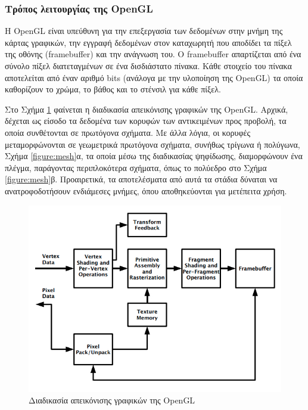 \subsubsection{Τρόπος λειτουργίας της OpenGL}
\label{section:opengl_framebuffer}
Η OpenGL είναι υπεύθυνη για την επεξεργασία των δεδομένων στην μνήμη της κάρτας γραφικών, την εγγραφή δεδομένων στον καταχωρητή που αποδίδει τα πίξελ της οθόνης (framebuffer) και την ανάγνωση του. Ο framebuffer απαρτίζεται από ένα σύνολο πίξελ διατεταγμένων σε ένα δισδιάστατο πίνακα. Κάθε στοιχείο του πίνακα αποτελείται από έναν αριθμό bits (ανάλογα με την υλοποίηση της OpenGL) τα οποία καθορίζουν το χρώμα, το βάθος και το στένσιλ για κάθε πίξελ.

Στο Σχήμα \ref{figure:opengl_pipeline} φαίνεται η διαδικασία απεικόνισης γραφικών της OpenGL. Αρχικά, δέχεται ως είσοδο τα δεδομένα των κορυφών των αντικειμένων προς προβολή, τα οποία συνθέτονται σε πρωτόγονα σχήματα. Με άλλα λόγια, οι κορυφές μεταμορφώνονται σε γεωμετρικά πρωτόγονα σχήματα, συνήθως τρίγωνα ή πολύγωνα, Σχήμα \ref{figure:mesh}α, τα οποία μέσω της διαδικασίας ψηφίδωσης, διαμορφώνουν ένα πλέγμα, παράγοντας περιπλοκότερα σχήματα, όπως το πολύεδρο στο Σχήμα \ref{figure:mesh}β. Προαιρετικά, τα αποτελέσματα από αυτά τα στάδια δύναται να ανατροφοδοτήσουν ενδιάμεσες μνήμες, όπου αποθηκεύονται για μετέπειτα χρήση.

\begin{figure}[h]
	\centering
	\includegraphics[scale=2.2]{images/chapter2/opengl_pipeline.jpg}
	\caption{Διαδικασία απεικόνισης γραφικών της OpenGL}
	\label{figure:opengl_pipeline}
\end{figure}

